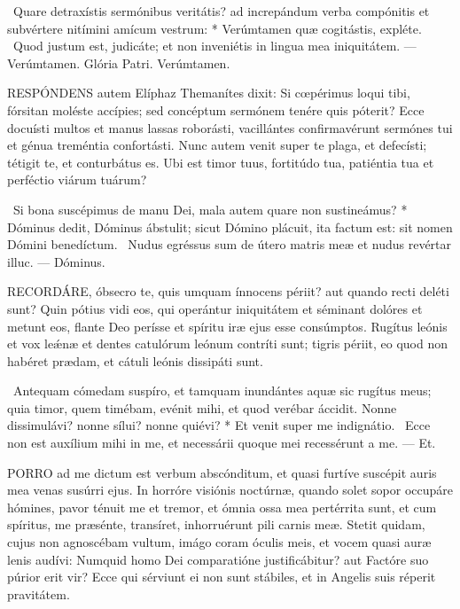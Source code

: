 \R\ Quare detraxístis sermónibus veritátis? ad increpándum verba compónitis et subvértere nitímini amícum vestrum: * Verúmtamen quæ cogitástis, expléte. \V\ Quod justum est, judicáte; et non inveniétis in lingua mea iniquitátem. — Verúmtamen. Glória Patri. Verúmtamen.




\lettrine[lines=2]{R}{ESPÓNDENS} autem Elíphaz Themanítes dixit: Si cœpérimus loqui tibi, fórsitan moléste accípies; sed concéptum sermónem tenére quis póterit? Ecce docuísti multos et manus lassas roborásti, vacillántes confirmavérunt sermónes tui et génua treméntia confortásti. Nunc autem venit super te plaga, et defecísti; tétigit te, et conturbátus es. Ubi est timor tuus, fortitúdo tua, patiéntia tua et perféctio viárum tuárum?

\R\ Si bona suscépimus de manu Dei, mala autem quare non sustineámus? * Dóminus dedit, Dóminus ábstulit; sicut Dómino plácuit, ita factum est: sit nomen Dómini benedíctum. \V\ Nudus egréssus sum de útero matris meæ et nudus revértar illuc. — Dóminus.


\lettrine[lines=2]{R}{ECORDÁRE}, óbsecro te, quis umquam ínnocens périit? aut quando recti deléti sunt? Quin pótius vidi eos, qui operántur iniquitátem et séminant dolóres et metunt eos, flante Deo perísse et spíritu iræ ejus esse consúmptos. Rugítus leónis et vox leǽnæ et dentes catulórum leónum contríti sunt; tigris périit, eo quod non habéret prædam, et cátuli leónis dissipáti sunt.

\R\ Antequam cómedam suspíro, et tamquam inundántes aquæ sic rugítus meus; quia timor, quem timébam, evénit mihi, et quod verébar áccidit. Nonne dissimulávi? nonne sílui? nonne quiévi? * Et venit super me indignátio. \V\ Ecce non est auxílium mihi in me, et necessárii quoque mei recessérunt a me. — Et.



\lettrine[lines=2]{P}{ORRO} ad me dictum est verbum abscónditum, et quasi furtíve suscépit auris mea venas susúrri ejus. In horróre visiónis noctúrnæ, quando solet sopor occupáre hómines, pavor ténuit me et tremor, et ómnia ossa mea pertérrita sunt, et cum spíritus, me præsénte, transíret, inhorruérunt pili carnis meæ. Stetit quidam, cujus non agnoscébam vultum, imágo coram óculis meis, et vocem quasi auræ lenis audívi: Numquid homo Dei comparatióne justificábitur? aut Factóre suo púrior erit vir? Ecce qui sérviunt ei non sunt stábiles, et in Angelis suis réperit pravitátem.

